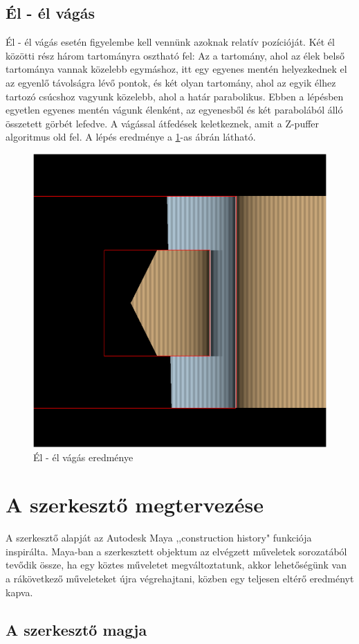 \subsection{Él - él vágás}
Él - él vágás esetén figyelembe kell vennünk azoknak relatív pozícióját. Két él közötti rész három tartományra osztható fel: Az a tartomány, ahol az élek belső tartománya vannak közelebb egymáshoz, itt egy egyenes mentén helyezkednek el az egyenlő távolságra lévő pontok, és két olyan tartomány, ahol az egyik élhez tartozó csúcshoz vagyunk közelebb, ahol a határ parabolikus. Ebben a lépésben egyetlen egyenes mentén vágunk élenként, az egyenesből és két parabolából álló összetett görbét lefedve. A vágással átfedések keletkeznek, amit a Z-puffer algoritmus old fel. A lépés eredménye a \ref{fig:segment_segment_cut-1}-as ábrán látható.

\begin{figure}[H]
	\centering
	\includegraphics[width=.55\linewidth]{images/segment_segment_cut.png}
	\caption{Él - él vágás eredménye}
	\label{fig:segment_segment_cut-1}
\end{figure}

\section{A szerkesztő megtervezése}
A szerkesztő alapját az Autodesk Maya ,,construction history" funkciója inspirálta. Maya-ban a szerkesztett objektum az elvégzett műveletek sorozatából tevődik össze, ha egy köztes műveletet megváltoztatunk, akkor lehetőségünk van a rákövetkező műveleteket újra végrehajtani, közben egy teljesen eltérő eredményt kapva.

\subsection{A szerkesztő magja}

